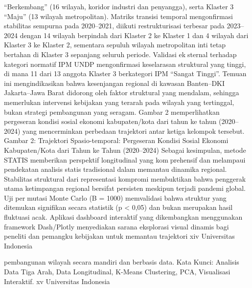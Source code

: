 “Berkembang” (16 wilayah, koridor industri dan penyangga), serta Klaster 3 “Maju” (13
wilayah metropolitan). Matriks transisi temporal mengonfirmasi stabilitas sempurna pada
2020–2021, diikuti restrukturisasi terbesar pada 2023–2024 dengan 14 wilayah berpindah
dari Klaster 2 ke Klaster 1 dan 4 wilayah dari Klaster 3 ke Klaster 2, sementara sepuluh
wilayah metropolitan inti tetap bertahan di Klaster 3 sepanjang seluruh periode. Validasi eksternal terhadap kategori normatif IPM UNDP mengonfirmasi keselarasan struktural yang
tinggi, di mana 11 dari 13 anggota Klaster 3 berkategori IPM “Sangat Tinggi”. Temuan
ini mengindikasikan bahwa kesenjangan regional di kawasan Banten–DKI Jakarta–Jawa
Barat didorong oleh faktor struktural yang mendalam, sehingga memerlukan intervensi
kebijakan yang terarah pada wilayah yang tertinggal, bukan strategi pembangunan yang
seragam. Gambar 2 memperlihatkan pergeseran kondisi sosial ekonomi kabupaten/kota
dari tahun ke tahun (2020–2024) yang mencerminkan perbedaan trajektori antar ketiga
kelompok tersebut.
Gambar 2: Trajektori Spasio-temporal: Pergeseran Kondisi Sosial Ekonomi
Kabupaten/Kota dari Tahun ke Tahun (2020–2024)
Sebagai kesimpulan, metode STATIS memberikan perspektif longitudinal yang komprehensif dan melampaui pendekatan analisis statis tradisional dalam memantau dinamika
regional. Stabilitas struktural dari representasi kompromi membuktikan bahwa penggerak
utama ketimpangan regional bersifat persisten meskipun terjadi pandemi global. Uji permutasi Monte Carlo (B = 1000) memvalidasi bahwa struktur yang ditemukan signifikan
secara statistik (p < 0,05) dan bukan merupakan hasil fluktuasi acak. Aplikasi dashboard
interaktif yang dikembangkan menggunakan framework Dash/Plotly menyediakan sarana
eksplorasi visual dinamis bagi peneliti dan pemangku kebijakan untuk memantau trajektori
xiv Universitas Indonesia

pembangunan wilayah secara mandiri dan berbasis data.
Kata Kunci: Analisis Data Tiga Arah, Data Longitudinal, K-Means Clustering, PCA,
Visualisasi Interaktif.
xv Universitas Indonesia


